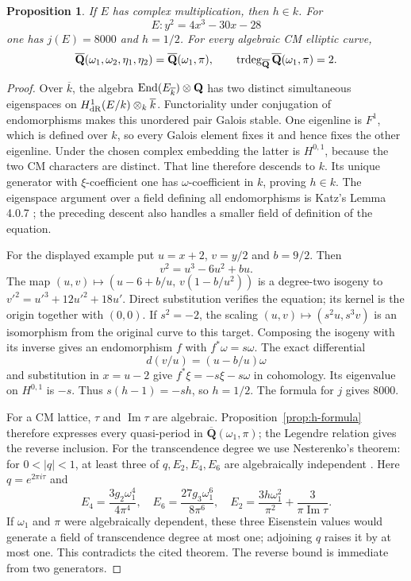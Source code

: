 \documentclass[11pt]{article}
\newtheorem{proposition}[theorem]{Proposition}
\theoremstyle{definition}\newtheorem{definition}[theorem]{Definition}
\theoremstyle{remark}\newtheorem{remark}[theorem]{Remark}
\newcommand{\Q}{\mathbf Q}\newcommand{\Z}{\mathbf Z}
\newcommand{\Qb}{\overline{\mathbf Q}}\newcommand{\Fp}{\mathbf F_p}
\begin{document}
\begin{proposition}\label{prop:cm-h}
If $E$ has complex multiplication, then $h\in k$. For
\[
                 E:y^2=4x^3-30x-28
\]
one has $j(E)=8000$ and $h=1/2$. For every algebraic CM elliptic curve,
\[
 \Qb(\omega_1,\omega_2,\eta_1,\eta_2)=\Qb(\omega_1,\pi),
 \qquad \trdeg_{\Qb}\Qb(\omega_1,\pi)=2.
\]
\end{proposition}
\begin{proof}
Over $\overline k$, the algebra $\End(E_{\overline k})\otimes\Q$ has two distinct simultaneous eigenspaces on $H^1_{\mathrm{dR}}(E/k)\otimes_k\overline k$. Functoriality under conjugation of endomorphisms makes this unordered pair Galois stable. One eigenline is $F^1$, which is defined over $k$, so every Galois element fixes it and hence fixes the other eigenline. Under the chosen complex embedding the latter is $H^{0,1}$, because the two CM characters are distinct. That line therefore descends to $k$. Its unique generator with $\xi$-coefficient one has $\omega$-coefficient in $k$, proving $h\in k$. The eigenspace argument over a field defining all endomorphisms is Katz's Lemma 4.0.7 \cite[p.~501]{Katz}; the preceding descent also handles a smaller field of definition of the equation.

For the displayed example put $u=x+2$, $v=y/2$ and $b=9/2$. Then
\[
 v^2=u^3-6u^2+bu.
\]
The map $(u,v)\mapsto(u-6+b/u,\,v(1-b/u^2))$ is a degree-two isogeny to $v'^2=u'^3+12u'^2+18u'$. Direct substitution verifies the equation; its kernel is the origin together with $(0,0)$. If $s^2=-2$, the scaling $(u,v)\mapsto(s^2u,s^3v)$ is an isomorphism from the original curve to this target. Composing the isogeny with its inverse gives an endomorphism $f$ with $f^*\omega=s\omega$. The exact differential
\[
 d(v/u)=(u-b/u)\omega
\]
and substitution in $x=u-2$ give $f^*\xi=-s\xi-s\omega$ in cohomology. Its eigenvalue on $H^{0,1}$ is $-s$. Thus $s(h-1)=-sh$, so $h=1/2$. The formula for $j$ gives $8000$.

For a CM lattice, $\tau$ and $\operatorname{Im}\tau$ are algebraic. Proposition~\ref{prop:h-formula} therefore expresses every quasi-period in $\Qb(\omega_1,\pi)$; the Legendre relation gives the reverse inclusion. For the transcendence degree we use Nesterenko's theorem: for $0<|q|<1$, at least three of $q,E_2,E_4,E_6$ are algebraically independent \cite[Theorem 1, p.~1320]{Nesterenko}. Here $q=e^{2\pi i\tau}$ and
\[
 E_4=\frac{3g_2\omega_1^4}{4\pi^4},\quad
 E_6=\frac{27g_3\omega_1^6}{8\pi^6},\quad
 E_2=\frac{3h\omega_1^2}{\pi^2}+\frac{3}{\pi\operatorname{Im}\tau}.
\]
If $\omega_1$ and $\pi$ were algebraically dependent, these three Eisenstein values would generate a field of transcendence degree at most one; adjoining $q$ raises it by at most one. This contradicts the cited theorem. The reverse bound is immediate from two generators.
\end{proof}
\end{document}
